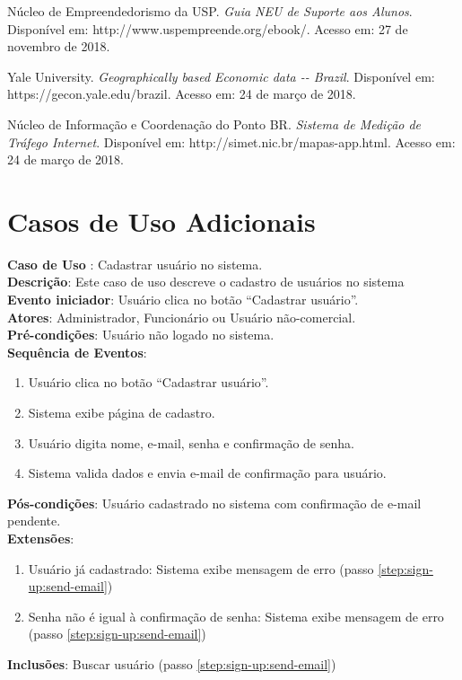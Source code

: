 \documentclass[]{politex}
\begin{document}
\begin{thebibliography}{9}
    Núcleo de Empreendedorismo da USP.
    \textit{Guia NEU de Suporte aos Alunos}.
    Disponível em: http://www.uspempreende.org/ebook/.
    Acesso em: 27 de novembro de 2018.

    Yale University.
    \textit{Geographically based Economic data -{}- Brazil}.
    Disponível em: https://gecon.yale.edu/brazil.
    Acesso em: 24 de março de 2018.

    Núcleo de Informação e Coordenação do Ponto BR.
    \textit{Sistema de Medição de Tráfego Internet}.
    Disponível em: http://simet.nic.br/mapas-app.html.
    Acesso em: 24 de março de 2018.

\end{thebibliography}
\apendice
\chapter{Casos de Uso Adicionais}\label{additional-case-uses}

\noindent \textbf{Caso de Uso }: Cadastrar usuário no
sistema.  \\
\textbf{Descrição}: Este caso de uso descreve o cadastro de usuários no
sistema \\
\textbf{Evento iniciador}: Usuário clica no botão ``Cadastrar usuário''. \\
\textbf{Atores}: Administrador, Funcionário ou Usuário não-comercial. \\
\textbf{Pré-condições}: Usuário não logado no sistema. \\
\textbf{Sequência de Eventos}:
\begin{enumerate}
\item Usuário clica no botão ``Cadastrar usuário''.
\item Sistema exibe página de cadastro.
\item Usuário digita nome, e-mail, senha e confirmação de senha.
\item\label{step:sign-up:send-email} Sistema valida dados e envia e-mail de
confirmação para usuário.
\end{enumerate}
\textbf{Pós-condições}: Usuário cadastrado no sistema com confirmação de e-mail
pendente. \\
\textbf{Extensões}:
\begin{enumerate}
\item Usuário já cadastrado: Sistema exibe mensagem de erro (passo
\ref{step:sign-up:send-email})
\item Senha não é igual à confirmação de senha: Sistema exibe mensagem de erro
(passo \ref{step:sign-up:send-email})
\end{enumerate}
\textbf{Inclusões}: Buscar usuário (passo \ref{step:sign-up:send-email}) \\
\end{document}
